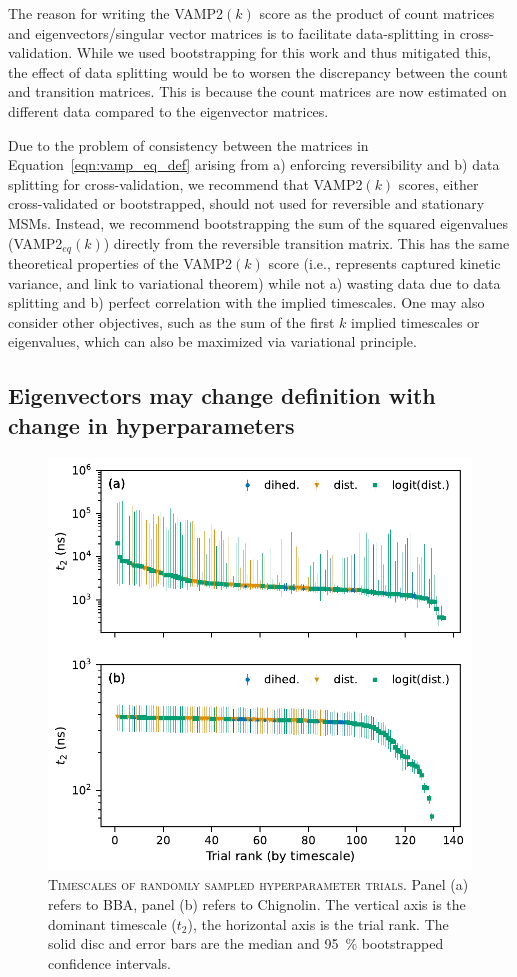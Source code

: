\documentclass[journal=jacsat,manuscript=article]{achemso}
\begin{document}
The reason for writing the VAMP2$(k)$ score as the product of count matrices and eigenvectors/singular vector matrices is to facilitate data-splitting in cross-validation. While we used bootstrapping for this work and thus mitigated this, the effect of data splitting would be to worsen the discrepancy between the count and transition matrices. This is because the count matrices are now estimated on different data compared to the eigenvector matrices.  

Due to the problem of consistency between the matrices in Equation~\ref{eqn:vamp_eq_def} arising from a) enforcing reversibility and b) data splitting for cross-validation,  we recommend that VAMP2$(k)$ scores, either cross-validated or bootstrapped, should not used for reversible and stationary MSMs. Instead, we recommend bootstrapping the sum of the squared eigenvalues (VAMP2$_{eq}(k)$) directly from the reversible transition matrix. This has the same theoretical properties of the VAMP2$(k)$ score (i.e., represents captured kinetic variance, and link to variational theorem) while not a) wasting data due to data splitting and b) perfect correlation with the implied timescales. One may also consider other objectives, such as the sum of the first $k$ implied timescales or eigenvalues, which can also be maximized via variational principle. 

\FloatBarrier
\clearpage

\subsection{Eigenvectors may change definition with change in hyperparameters}

\begin{figure}[ht]
    \centering
    \includegraphics[width=0.7\columnwidth]{results1/timescale_distributions.pdf}
    \caption{\textsc{Timescales of randomly sampled hyperparameter trials.} Panel (a) refers to BBA, panel (b) refers to Chignolin. The vertical axis is the dominant timescale ($t_2$), the horizontal axis is the trial rank. The solid disc and error bars are the median and \SI{95}{\percent} bootstrapped confidence intervals.  }
    \label{fig:random_trials}
\end{figure}
\end{document}
